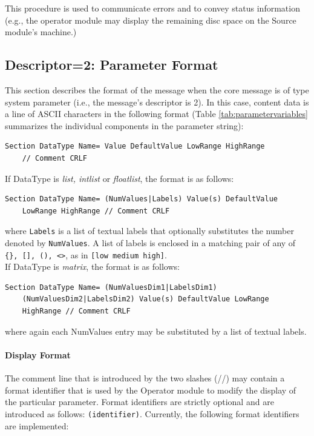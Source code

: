 \documentclass[letterpaper,oneside,12pt]{book}
\newcommand{\todo}[1]{}
\begin{document}
This procedure is used to communicate errors and to convey status information (e.g.,
the operator module may display the remaining disc space on the Source module's
machine.)

\subsection{Descriptor=2: Parameter Format}
\label{parameter_format}

This section describes the format of the message when the core message is of 
type system parameter (i.e., the message's descriptor is 2). In this case, 
content data is a line of ASCII characters in the following format 
(Table \ref{tab:parametervariables} summarizes
the individual components in the parameter string):
\begin{verbatim}
Section DataType Name= Value DefaultValue LowRange HighRange
    // Comment CRLF
\end{verbatim}
If DataType is \textit{list, intlist} or \textit{floatlist}, the format is
as follows: 
\begin{verbatim}
Section DataType Name= (NumValues|Labels) Value(s) DefaultValue
    LowRange HighRange // Comment CRLF
\end{verbatim}
where \texttt{Labels} is a list of textual labels that optionally substitutes the number denoted by \texttt{NumValues}. A list of labels is enclosed in a matching pair of any of \verb|{}, [], (), <>|, as in 
\verb|[low medium high]|.
\\[2ex]
If DataType is \textit{matrix}, the format is as follows:
\begin{verbatim}
Section DataType Name= (NumValuesDim1|LabelsDim1)
    (NumValuesDim2|LabelsDim2) Value(s) DefaultValue LowRange
    HighRange // Comment CRLF
\end{verbatim}
where again each NumValues entry may be substituted by a list of textual labels.

\todo{Need to give a few examples of possible parameter lines and need
to describe the format of the encoding if values include spaces, etc.}

\paragraph{Display Format} The comment line that is introduced by the two 
slashes (//) may contain a format identifier that is used by the Operator module
to modify the display of the particular parameter. Format identifiers are
strictly optional and are introduced as follows: \texttt{(identifier)}.
Currently, the following format identifiers are implemented:
\end{document}

